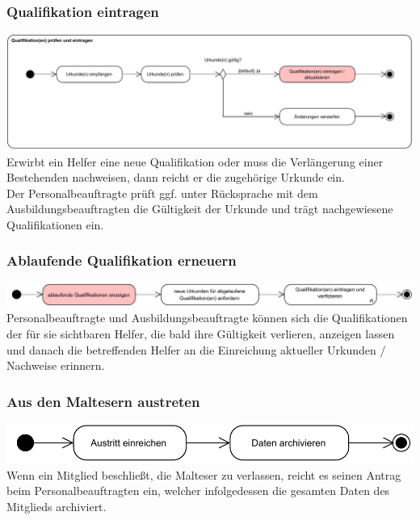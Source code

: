 \documentclass{beamer}
\begin{document}
\begin{frame}
\frametitle{Qualifikation eintragen}
\includegraphics[width=\textwidth]{PDF/BusinessP/Qualifikation_eintragen.pdf}
Erwirbt ein Helfer eine neue Qualifikation oder muss die Verlängerung einer Bestehenden nachweisen, dann reicht er die zugehörige Urkunde ein.\\
Der Personalbeauftragte prüft ggf. unter Rücksprache mit dem Ausbildungsbeauftragten die Gültigkeit der Urkunde und trägt nachgewiesene Qualifikationen ein.
\end{frame}


\begin{frame}
\frametitle{Ablaufende Qualifikation erneuern}
\includegraphics[width=\textwidth]{PDF/BusinessP/Qualifikation_erneuern.pdf}
Personalbeauftragte und Ausbildungsbeauftragte können sich die Qualifikationen der für sie sichtbaren Helfer, die bald ihre Gültigkeit verlieren, anzeigen lassen und danach die betreffenden Helfer an die Einreichung aktueller Urkunden / Nachweise erinnern.
\end{frame}

\begin{frame}
\frametitle{Aus den Maltesern austreten}
\includegraphics[width=\textwidth]{PDF/BusinessP/Austreten.pdf}
Wenn ein Mitglied beschließt, die Malteser zu verlassen, reicht es seinen Antrag beim Personalbeauftragten ein, welcher infolgedessen die gesamten Daten des Mitglieds archiviert.
\end{frame}
\end{document}
